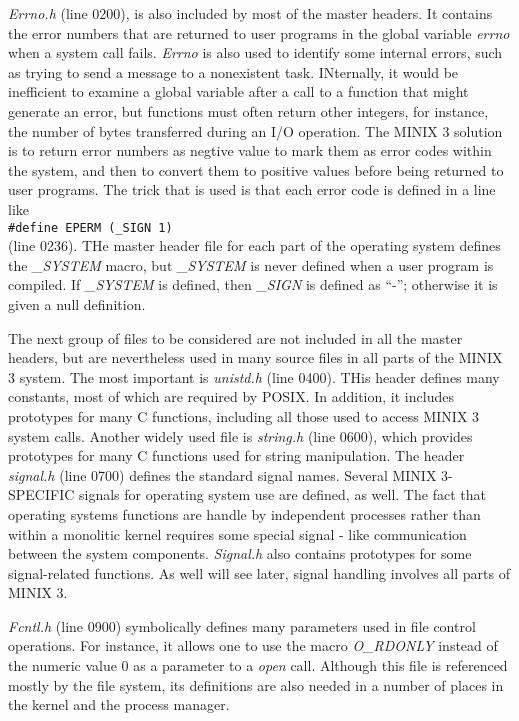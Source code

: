 \documentclass{book}
\newcommand {\sys} [1] {\textsl{#1}}
\newcommand {\cmd} [1] {\texttt{#1}}
\begin{document}
\sys{Errno.h} (line 0200), is also included by most of the master headers.
It contains the error numbers that are returned to user programs in the global variable \sys{errno} when a system call fails.
\sys{Errno} is also used to identify some internal errors, 
such as trying to send a message to a nonexistent task.
INternally, it would be inefficient to examine a global variable after a call to a function
that might generate an error, but functions must often return other integers,
for instance, the number of bytes transferred during an I/O operation.
The MINIX 3 solution is to return error numbers as negtive value to mark them as error codes within the system,
and then to convert them to positive values before being returned to user programs.
The trick that is used is that each error code is defined in a line like \\
\cmd{\#define EPERM (\_SIGN 1)}\\
(line 0236).
THe master header file for each part of the operating system defines the \sys{\_SYSTEM} macro, 
but \sys{\_SYSTEM} is never defined when a user program is compiled.
If \sys{\_SYSTEM} is defined, then \sys{\_SIGN} is defined as ``-''; otherwise it is given a null definition.

The next group of files to be considered are not included in all the master headers,
but are nevertheless used in many source files in all parts of the MINIX 3 system.
The most important is \sys{unistd.h} (line 0400).
THis header defines many constants, most of which are required by POSIX.
In addition, it includes prototypes for many C functions,
including all those used to access MINIX 3 system calls.
Another widely used file is \sys{string.h} (line 0600),
which provides prototypes for many C functions used for string manipulation.
The header \sys{signal.h} (line 0700) defines the standard signal names.
Several MINIX 3-SPECIFIC signals for operating system use are defined, as well.
The fact that 
operating systems functions are handle by independent processes rather than within a monolitic kernel
requires some special signal - like communication between the system components.
\sys{Signal.h} also contains prototypes for some signal-related functions.
As well will see later, signal handling involves all parts of MINIX 3.

\sys{Fcntl.h} (line 0900) symbolically defines many parameters used in file control operations.
For instance, it allows one to use the macro \sys{O\_RDONLY} instead of the numeric value 0 as a parameter to a \sys{open} call.
Although this file is referenced mostly by the file system,
its definitions are also needed in a number of places in the kernel and the process manager.
\end{document}
